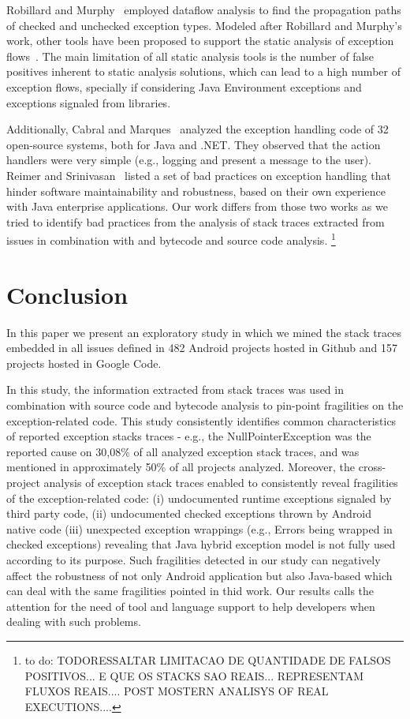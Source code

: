 \documentclass[conference]{IEEEtran}
\begin{document}
Robillard and Murphy~\cite{Robil00}
employed dataflow analysis to find the propagation paths of checked and
unchecked exception types. Modeled after Robillard and Murphy's work, other
tools have been proposed to support the static analysis of exception
flows~\cite{coelho2008assessing}. The main limitation of all
static analysis tools is the number of false positives inherent to static analysis
solutions, which can lead to a high number of exception flows, specially if
considering Java Environment exceptions and exceptions signaled from libraries.
 
Additionally, Cabral and Marques~\cite{cabral2007exception} analyzed the
exception handling code of 32 open-source systems, both for Java and .NET. They
observed that the action handlers were very simple (e.g., logging and present a
message to the user). Reimer and Srinivasan~\cite{reimer2003analyzing} listed a
set of bad practices on exception handling that hinder software maintainability
and robustness, based on their own experience with Java enterprise applications.
Our work differs from those two works as we tried to identify bad practices from
the analysis of stack traces extracted from issues in combination with and bytecode and source
code analysis. \footnote{ to do: TODORESSALTAR LIMITACAO DE QUANTIDADE DE FALSOS POSITIVOS... E QUE OS STACKS SAO REAIS...
REPRESENTAM FLUXOS REAIS.... POST MOSTERN ANALISYS OF REAL EXECUTIONS....}

\enlargethispage{-2\baselineskip}

\section{Conclusion}
\label{sec:conc}

In this paper we present an exploratory study in which we mined the stack 
traces embedded in all issues defined in 482 Android projects hosted in Github and 
157 projects hosted in Google Code.

In this study, the information extracted from stack traces was used in combination 
with source code and bytecode analysis to pin-point fragilities on the exception-related
code. 
This study  consistently identifies common characteristics of reported 
exception stacks traces - e.g., the NullPointerException was the reported cause 
on 30,08\% of all analyzed exception stack traces, and was mentioned in approximately 
50\% of all projects analyzed. Moreover,  the cross-project analysis of exception stack traces 
enabled to consistently reveal  fragilities of the exception-related code: 
(i) undocumented runtime exceptions signaled by third party code,
(ii) undocumented checked exceptions thrown by Android native code
(iii) unexpected exception wrappings (e.g., Errors being wrapped in checked exceptions) 
revealing that Java hybrid exception model is not fully used according to its purpose.
Such fragilities detected in our study can negatively affect the 
robustness of not only Android application but also Java-based 
which can deal with the same fragilities pointed in thid work. 
Our results calls the attention for the need of tool and language support to help 
developers when dealing with such problems.
\end{document}
